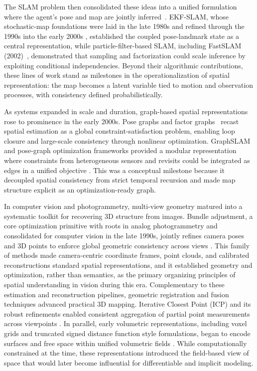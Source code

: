 The SLAM problem then consolidated these ideas into a unified formulation where the agent's pose and map are jointly inferred~\cite{dissanayake2001solution}.
EKF-SLAM, whose stochastic-map foundations were laid in the late 1980s \cite{smith1990estimating} and refined through the 1990s into the early 2000s \cite{bailey2006consistency}, established the coupled pose-landmark state as a central representation, while particle-filter-based SLAM, including FastSLAM (2002)~\cite{montemerlo2002fastslam}, demonstrated that sampling and factorization could scale inference by exploiting conditional independencies.
Beyond their algorithmic contributions, these lines of work stand as milestones in the operationalization of spatial representation: the map becomes a latent variable tied to motion and observation processes, with consistency defined probabilistically.

As systems expanded in scale and duration, graph-based spatial representations rose to prominence in the early 2000s.
Pose graphs and factor graphs~\cite{lu1997globally} recast spatial estimation as a global constraint-satisfaction problem, enabling loop closure and large-scale consistency through nonlinear optimization.
GraphSLAM~\cite{thrun2006graph} and pose-graph optimization frameworks provided a modular representation where constraints from heterogeneous sensors and revisits could be integrated as edges in a unified objective \cite{grisetti2010tutorial}.
This was a conceptual milestone because it decoupled spatial consistency from strict temporal recursion and made map structure explicit as an optimization-ready graph.


In computer vision and photogrammetry, multi-view geometry matured into a systematic toolkit for recovering 3D structure from images.
Bundle adjustment, a core optimization primitive with roots in analog photogrammetry and consolidated for computer vision in the late 1990s, jointly refines camera poses and 3D points to enforce global geometric consistency across views \cite{triggs2000bundle}.
This family of methods made camera-centric coordinate frames, point clouds, and calibrated reconstructions standard spatial representations, and it established geometry and optimization, rather than semantics, as the primary organizing principles of spatial understanding in vision during this era.
Complementary to these estimation and reconstruction pipelines, geometric registration and fusion techniques advanced practical 3D mapping.
Iterative Closest Point (ICP) and its robust refinements enabled consistent aggregation of partial point measurements across viewpoints \cite{besl1992method,chetverikov2002trimmed}.
In parallel, early volumetric representations, including voxel grids and truncated signed distance function style formulations, began to encode surfaces and free space within unified volumetric fields \cite{lorensen1998marching,curless1996volumetric,newcombe2011kinectfusion,niessner2013real}.
While computationally constrained at the time, these representations introduced the field-based view of space that would later become influential for differentiable and implicit modeling.


